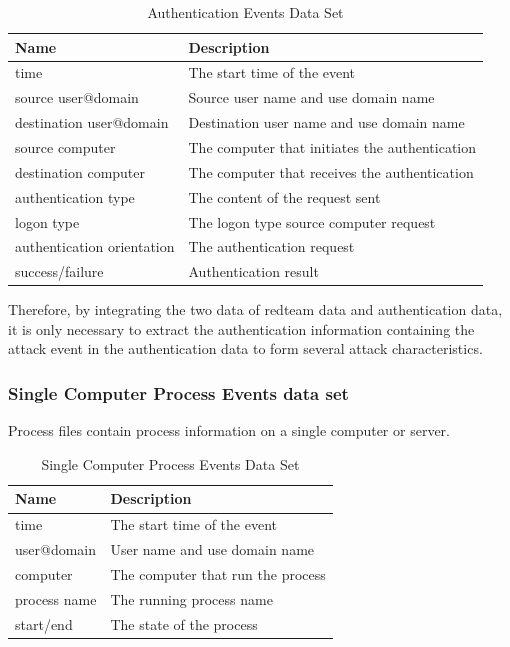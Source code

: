 \documentclass[12pt,journal,draftcls,doublespace, letterpaper,onecolumn]{IEEEtran}
\begin{document}
\begin{table}[h]
	\caption{Authentication Events Data Set}
	\vspace{1pt}
	\centering
	\begin{tabular}{p{2.5cm}p{5cm}}
		\hline
		Name & Description \\
		\hline
		time  & The start time of the event\\
		source user@domain  & Source user name and use domain name\\ 
		destination user@domain  & Destination user name and use domain name\\ 
		source computer  & The computer that initiates the authentication\\ 
		destination computer  & The computer that receives the authentication\\
		authentication type  & The content of the request sent\\ 
		logon type  & The logon type source computer request\\ 
		authentication orientation  & The authentication request\\ 
		success/failure  & Authentication result\\ 
		\hline       
	\end{tabular}
	\label{bs2}
\end{table}

Therefore, by integrating the two data of redteam data and authentication data, it is only necessary to extract the authentication information containing the attack event in the authentication data to form several attack characteristics.

\subsubsection{Single Computer Process Events data set}

Process files contain process information on a single computer or server.


\begin{table}[h]
	\caption{Single Computer Process Events Data Set}
	\vspace{1pt}
	\centering
	\begin{tabular}{p{2.5cm}p{5cm}}
		\hline
		Name & Description \\
		\hline
		time  & The start time of the event\\
		user@domain  & User name and use domain name\\  
		computer  & The computer that run the process\\ 
		process name  & The running process name\\
		start/end  & The state of the process\\ 
		\hline       
	\end{tabular}
	\label{bs2}
\end{table}
\end{document}
